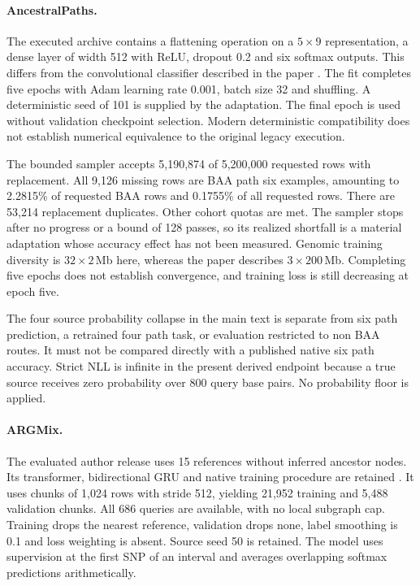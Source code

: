 \documentclass[letterpaper]{article}
\begin{document}
\paragraph{AncestralPaths.}
The executed archive contains a flattening operation on a $5\times9$ representation, a dense layer of width 512 with ReLU, dropout 0.2 and six softmax outputs. This differs from the convolutional classifier described in the paper \citep{eurasians2024}. The fit completes five epochs with Adam learning rate 0.001, batch size 32 and shuffling. A deterministic seed of 101 is supplied by the adaptation. The final epoch is used without validation checkpoint selection. Modern deterministic compatibility does not establish numerical equivalence to the original legacy execution.

The bounded sampler accepts 5,190,874 of 5,200,000 requested rows with replacement. All 9,126 missing rows are BAA path six examples, amounting to 2.2815\% of requested BAA rows and 0.1755\% of all requested rows. There are 53,214 replacement duplicates. Other cohort quotas are met. The sampler stops after no progress or a bound of 128 passes, so its realized shortfall is a material adaptation whose accuracy effect has not been measured. Genomic training diversity is $32\times2$\,Mb here, whereas the paper describes $3\times200$\,Mb. Completing five epochs does not establish convergence, and training loss is still decreasing at epoch five.

The four source probability collapse in the main text is separate from six path prediction, a retrained four path task, or evaluation restricted to non BAA routes. It must not be compared directly with a published native six path accuracy. Strict NLL is infinite in the present derived endpoint because a true source receives zero probability over 800 query base pairs. No probability floor is applied.

\paragraph{ARGMix.}
The evaluated author release uses 15 references without inferred ancestor nodes. Its transformer, bidirectional GRU and native training procedure are retained \citep{ancientancestry2026}. It uses chunks of 1,024 rows with stride 512, yielding 21,952 training and 5,488 validation chunks. All 686 queries are available, with no local subgraph cap. Training drops the nearest reference, validation drops none, label smoothing is 0.1 and loss weighting is absent. Source seed 50 is retained. The model uses supervision at the first SNP of an interval and averages overlapping softmax predictions arithmetically.
\end{document}
